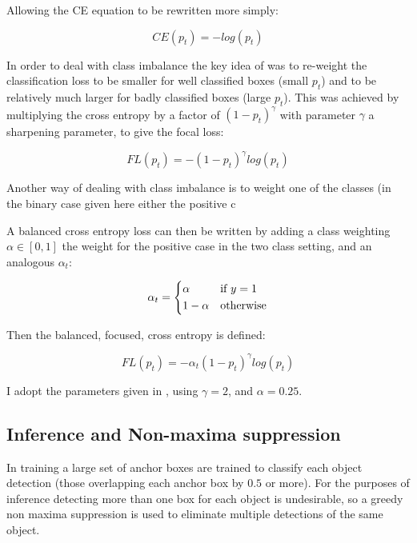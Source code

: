 Allowing the \gls{CE} equation to be rewritten more simply:

\begin{equation}
CE(p_t) = -log(p_t)
\label{eq:short_cross_entropy}
\end{equation}


In order to deal with class imbalance the key idea of \cite{Lin2017} was to re-weight the classification loss to be smaller for well classified boxes (small $p_t$) and to be relatively much larger for badly classified boxes (large $p_t$). This was achieved by multiplying the cross entropy by a factor of $(1 - p_t)^\gamma $ with parameter $\gamma$ a sharpening parameter, to give the focal loss:

\begin{equation}
FL(p_t) = - (1 - p_t)^\gamma log(p_t)
\label{eq:focal_loss_p}
\end{equation}

Another way of dealing with class imbalance is to weight one of the classes (in the binary case given here either the positive c

A balanced cross entropy loss can then be written by adding a class weighting $\alpha \in \left[0, 1\right]$ the weight for the positive case in the two class setting, and an analogous $\alpha_t$:

\begin{equation}
\alpha_t = 
  \begin{cases*}
  \alpha & if $y = 1$\\
  1 - \alpha & otherwise\\
  \end{cases*}
\label{eq:balanced_weight}
\end{equation}

Then the balanced, focused, cross entropy is defined:

\begin{equation}
FL(p_t) = -\alpha_t (1 - p_t)^\gamma log(p_t)
\label{eq:focal_loss}
\end{equation}


I adopt the parameters given in \cite{Lin2017}, using $ \gamma = 2 $, and $ \alpha = 0.25 $.

\subsection{Inference and Non-maxima suppression}

In training a large set of anchor boxes are trained to classify each object detection (those overlapping each anchor box by $0.5$ or more). For the purposes of inference detecting more than one box for each object is undesirable, so a greedy non maxima suppression is used to eliminate multiple detections of the same object.

